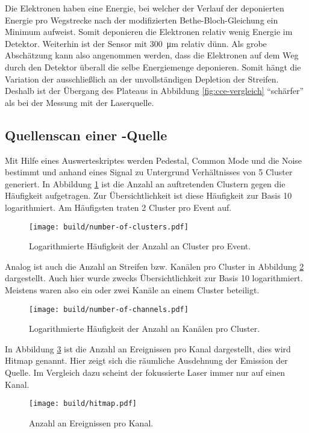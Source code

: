 Die Elektronen haben eine Energie, bei welcher der Verlauf der deponierten Energie
pro Wegstrecke nach der modifizierten Bethe-Bloch-Gleichung ein Minimum aufweist.
Somit deponieren die Elektronen relativ wenig Energie im Detektor.
Weiterhin ist der Sensor mit \SI{300}{\micro\meter} relativ dünn.
Als grobe Abschätzung kann also angenommen werden, dass die Elektronen auf dem
Weg durch den Detektor überall die selbe Energiemenge deponieren.
Somit hängt die Variation der \si{\adc} ausschließlich an der unvollständigen
Depletion der Streifen. Deshalb ist der Übergang des Plateaus in Abbildung
\ref{fig:cce-vergleich} \enquote{schärfer} als bei der Messung mit der Laserquelle.

\FloatBarrier
\subsection{Quellenscan einer \texorpdfstring{}{Sr}-Quelle}
\label{sec:Quellenscan-Auswertung}

Mit Hilfe eines Auswerteskriptes werden Pedestal, Common Mode und die Noise bestimmt
und anhand eines Signal zu Untergrund Verhältnisses von \num{5} Cluster generiert.
In Abbildung \ref{fig:number-of-clusters} ist die Anzahl an auftretenden Clustern gegen die
Häufigkeit aufgetragen. Zur Übersichtlichkeit ist diese Häufigkeit zur Basis \num{10}
logarithmiert.
Am Häufigsten traten \num{2} Cluster pro Event auf.
\begin{figure}
  \centering
  \texttt{[image: build/number-of-clusters.pdf]}  %
  \caption{Logarithmierte Häufigkeit der Anzahl an Cluster pro Event.}
  \label{fig:number-of-clusters}
\end{figure}
Analog ist auch die Anzahl an Streifen bzw. Kanälen pro Cluster in Abbildung
\ref{fig:number-of-channels} dargestellt. Auch hier wurde zwecks Übersichtlichkeit
zur Basis \num{10} logarithmiert.
Meistens waren also ein oder zwei Kanäle an einem Cluster beteiligt.
\begin{figure}
  \centering
  \texttt{[image: build/number-of-channels.pdf]}  %
  \caption{Logarithmierte Häufigkeit der Anzahl an Kanälen pro Cluster.}
  \label{fig:number-of-channels}
\end{figure}
In Abbildung \ref{fig:hitmap} ist die Anzahl an Ereignissen pro Kanal dargestellt,
dies wird Hitmap genannt. Hier zeigt sich die räumliche Ausdehnung der Emission der
Quelle. Im Vergleich dazu scheint der fokussierte Laser immer nur auf einen Kanal.
\begin{figure}
  \centering
  \texttt{[image: build/hitmap.pdf]}  %
  \caption{Anzahl an Ereignissen pro Kanal.}
  \label{fig:hitmap}
\end{figure}

